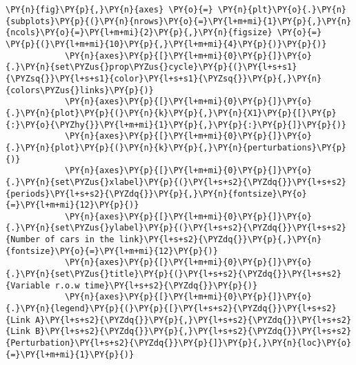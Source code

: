 \begin{Verbatim}[commandchars=\\\{\}]
            \PY{n}{fig}\PY{p}{,}\PY{n}{axes} \PY{o}{=} \PY{n}{plt}\PY{o}{.}\PY{n}{subplots}\PY{p}{(}\PY{n}{nrows}\PY{o}{=}\PY{l+m+mi}{1}\PY{p}{,}\PY{n}{ncols}\PY{o}{=}\PY{l+m+mi}{2}\PY{p}{,}\PY{n}{figsize} \PY{o}{=} \PY{p}{(}\PY{l+m+mi}{10}\PY{p}{,}\PY{l+m+mi}{4}\PY{p}{)}\PY{p}{)}
            \PY{n}{axes}\PY{p}{[}\PY{l+m+mi}{0}\PY{p}{]}\PY{o}{.}\PY{n}{set\PYZus{}prop\PYZus{}cycle}\PY{p}{(}\PY{l+s+s1}{\PYZsq{}}\PY{l+s+s1}{color}\PY{l+s+s1}{\PYZsq{}}\PY{p}{,}\PY{n}{colors\PYZus{}links}\PY{p}{)}
            \PY{n}{axes}\PY{p}{[}\PY{l+m+mi}{0}\PY{p}{]}\PY{o}{.}\PY{n}{plot}\PY{p}{(}\PY{n}{k}\PY{p}{,}\PY{n}{X1}\PY{p}{[}\PY{p}{:}\PY{o}{\PYZhy{}}\PY{l+m+mi}{1}\PY{p}{,}\PY{p}{:}\PY{p}{]}\PY{p}{)}
            \PY{n}{axes}\PY{p}{[}\PY{l+m+mi}{0}\PY{p}{]}\PY{o}{.}\PY{n}{plot}\PY{p}{(}\PY{n}{k}\PY{p}{,}\PY{n}{perturbations}\PY{p}{)}
            \PY{n}{axes}\PY{p}{[}\PY{l+m+mi}{0}\PY{p}{]}\PY{o}{.}\PY{n}{set\PYZus{}xlabel}\PY{p}{(}\PY{l+s+s2}{\PYZdq{}}\PY{l+s+s2}{periods}\PY{l+s+s2}{\PYZdq{}}\PY{p}{,}\PY{n}{fontsize}\PY{o}{=}\PY{l+m+mi}{12}\PY{p}{)}
            \PY{n}{axes}\PY{p}{[}\PY{l+m+mi}{0}\PY{p}{]}\PY{o}{.}\PY{n}{set\PYZus{}ylabel}\PY{p}{(}\PY{l+s+s2}{\PYZdq{}}\PY{l+s+s2}{Number of cars in the link}\PY{l+s+s2}{\PYZdq{}}\PY{p}{,}\PY{n}{fontsize}\PY{o}{=}\PY{l+m+mi}{12}\PY{p}{)}
            \PY{n}{axes}\PY{p}{[}\PY{l+m+mi}{0}\PY{p}{]}\PY{o}{.}\PY{n}{set\PYZus{}title}\PY{p}{(}\PY{l+s+s2}{\PYZdq{}}\PY{l+s+s2}{Variable r.o.w time}\PY{l+s+s2}{\PYZdq{}}\PY{p}{)}
            \PY{n}{axes}\PY{p}{[}\PY{l+m+mi}{0}\PY{p}{]}\PY{o}{.}\PY{n}{legend}\PY{p}{(}\PY{p}{[}\PY{l+s+s2}{\PYZdq{}}\PY{l+s+s2}{Link A}\PY{l+s+s2}{\PYZdq{}}\PY{p}{,}\PY{l+s+s2}{\PYZdq{}}\PY{l+s+s2}{Link B}\PY{l+s+s2}{\PYZdq{}}\PY{p}{,}\PY{l+s+s2}{\PYZdq{}}\PY{l+s+s2}{Perturbation}\PY{l+s+s2}{\PYZdq{}}\PY{p}{]}\PY{p}{,}\PY{n}{loc}\PY{o}{=}\PY{l+m+mi}{1}\PY{p}{)}
            

\end{Verbatim}
